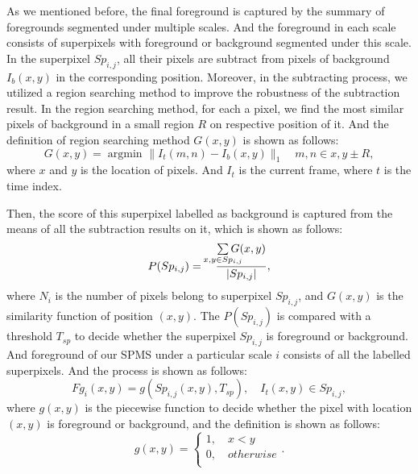 \documentclass[runningheads,a4paper]{llncs}
\DeclareMathOperator*{\argmin}{argmin}
\begin{document}
As we mentioned before, the final foreground is captured by the summary of
foregrounds segmented under multiple scales.
And the foreground in each scale consists of superpixels with foreground or
background segmented under this scale.
In the superpixel $Sp_{i,j}$, all their pixels are subtract from
pixels of background $I_b(x,y)$ in the corresponding position.
Moreover, in the subtracting process, we utilized a region searching method to
improve the robustness of the subtraction result.
% 
In the region searching method, for each a pixel, we find the most similar pixels of
background in a small region $R$ on respective position of it.
And the definition of region searching method $G(x,y)$ is shown as follows:
\begin{equation}
    G(x,y) =  \mathop{\argmin}_{}{ \lVert I_t(m,n) - I_b(x,y) \rVert_{1}  } \quad  m,n \in x,y \pm R,
\end{equation}
where $x$ and $y$ is the location of pixels. And $I_t$ is the current frame, where $t$ is the
time index.

Then, the score of this superpixel labelled as background is captured from the
means of all the subtraction results on it, which is shown as follows:
\begin{equation}
    P(Sp_{i,j}) = \quad \frac{ \sum\limits_{ \mathclap{x,y \in Sp_{i,j}} }G(x,y)}{|Sp_{i,j}|} ,
\end{equation}
where $N_i$ is the number of pixels belong to superpixel $Sp_{i,j}$, and
$G(x,y)$ is the similarity function of position $(x,y)$. The $P(Sp_{i,j})$ is
compared with a threshold $T_{sp}$ to decide whether the superpixel $Sp_{i,j}$
is foreground or background. And foreground of our SPMS under a particular
scale $i$ consists of all the labelled superpixels. And the process is shown as
follows:
\begin{equation}
    Fg_{i}(x,y) = g(Sp_{i,j}(x,y),T_{sp}), \quad I_t(x,y) \in Sp_{i,j},
\end{equation}
where $g(x,y)$ is the piecewise function to decide whether the pixel with
location $(x,y)$ is foreground or background, and the definition is shown as
follows:
\begin{equation}
    \label{piecewise_fg}
    g(x,y) =
 \begin{cases}
  1,  \quad x < y       \\
  0,  \quad otherwise   \\
\end{cases}.
\end{equation}
\end{document}
